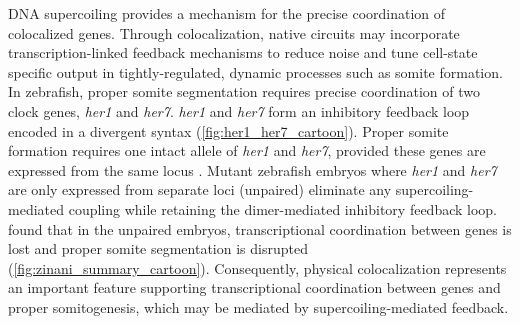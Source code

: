 \documentclass[11pt]{article}
\begin{document}
DNA supercoiling provides a mechanism for the precise coordination of colocalized genes. Through colocalization, native circuits may incorporate transcription-linked feedback mechanisms to reduce noise and tune cell-state specific output in tightly-regulated, dynamic processes such as somite formation. In zebrafish, proper somite segmentation requires precise coordination of two clock genes, \textit{her1} and \textit{her7}.   \textit{her1} and \textit{her7} form an inhibitory feedback loop encoded in a divergent syntax (\cref{fig:her1_her7_cartoon}). Proper somite formation requires one intact allele of \textit{her1} and \textit{her7}, provided these genes are expressed from the same locus \parencite{zinaniPairingSegmentationClock2021}.  Mutant zebrafish embryos where \emph{her1} and \emph{her7} are only expressed from separate loci (unpaired) eliminate any supercoiling-mediated coupling while retaining the dimer-mediated inhibitory feedback loop. \Textcite{zinaniPairingSegmentationClock2021} found that in the unpaired embryos, transcriptional coordination between genes is lost and proper somite segmentation is disrupted (\cref{fig:zinani_summary_cartoon}). Consequently, physical colocalization represents an important feature supporting transcriptional coordination between genes and proper somitogenesis, which may be mediated by supercoiling-mediated feedback.
\end{document}
